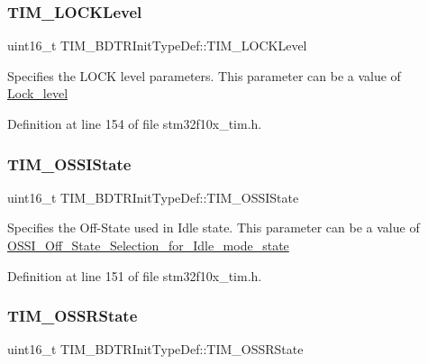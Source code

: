 \subsubsection{\texorpdfstring{T\+I\+M\+\_\+\+L\+O\+C\+K\+Level}{TIM\_LOCKLevel}}
{\footnotesize\ttfamily uint16\+\_\+t T\+I\+M\+\_\+\+B\+D\+T\+R\+Init\+Type\+Def\+::\+T\+I\+M\+\_\+\+L\+O\+C\+K\+Level}

Specifies the L\+O\+CK level parameters. This parameter can be a value of \hyperlink{group___lock__level}{Lock\+\_\+level} 

Definition at line 154 of file stm32f10x\+\_\+tim.\+h.

\mbox{\label{struct_t_i_m___b_d_t_r_init_type_def_ad8891e3739a7db8a45343d4e2f9d2824}} 
\subsubsection{\texorpdfstring{T\+I\+M\+\_\+\+O\+S\+S\+I\+State}{TIM\_OSSIState}}
{\footnotesize\ttfamily uint16\+\_\+t T\+I\+M\+\_\+\+B\+D\+T\+R\+Init\+Type\+Def\+::\+T\+I\+M\+\_\+\+O\+S\+S\+I\+State}

Specifies the Off-\/\+State used in Idle state. This parameter can be a value of \hyperlink{group___o_s_s_i___off___state___selection__for___idle__mode__state}{O\+S\+S\+I\+\_\+\+Off\+\_\+\+State\+\_\+\+Selection\+\_\+for\+\_\+\+Idle\+\_\+mode\+\_\+state} 

Definition at line 151 of file stm32f10x\+\_\+tim.\+h.

\mbox{\label{struct_t_i_m___b_d_t_r_init_type_def_a8f34ad7bc4764bd3ff372cadde468072}} 
\subsubsection{\texorpdfstring{T\+I\+M\+\_\+\+O\+S\+S\+R\+State}{TIM\_OSSRState}}
{\footnotesize\ttfamily uint16\+\_\+t T\+I\+M\+\_\+\+B\+D\+T\+R\+Init\+Type\+Def\+::\+T\+I\+M\+\_\+\+O\+S\+S\+R\+State}


